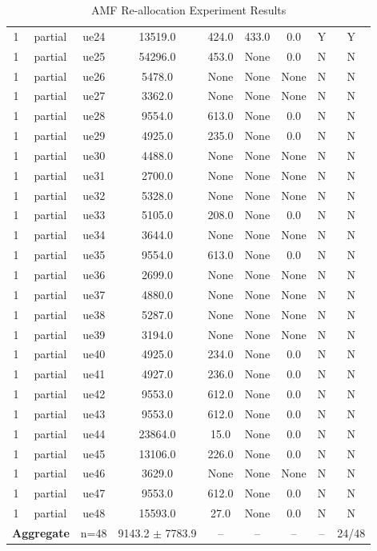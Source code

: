 \begin{table}[ht]
\begin{tabular}{|c|c|c|c|c|c|c|c|c|}
1 & partial & ue24 & 13519.0 & 424.0 & 433.0 & 0.0 & Y & Y \\
1 & partial & ue25 & 54296.0 & 453.0 & None & 0.0 & N & N \\
1 & partial & ue26 & 5478.0 & None & None & None & N & N \\
1 & partial & ue27 & 3362.0 & None & None & None & N & N \\
1 & partial & ue28 & 9554.0 & 613.0 & None & 0.0 & N & N \\
1 & partial & ue29 & 4925.0 & 235.0 & None & 0.0 & N & N \\
1 & partial & ue30 & 4488.0 & None & None & None & N & N \\
1 & partial & ue31 & 2700.0 & None & None & None & N & N \\
1 & partial & ue32 & 5328.0 & None & None & None & N & N \\
1 & partial & ue33 & 5105.0 & 208.0 & None & 0.0 & N & N \\
1 & partial & ue34 & 3644.0 & None & None & None & N & N \\
1 & partial & ue35 & 9554.0 & 613.0 & None & 0.0 & N & N \\
1 & partial & ue36 & 2699.0 & None & None & None & N & N \\
1 & partial & ue37 & 4880.0 & None & None & None & N & N \\
1 & partial & ue38 & 5287.0 & None & None & None & N & N \\
1 & partial & ue39 & 3194.0 & None & None & None & N & N \\
1 & partial & ue40 & 4925.0 & 234.0 & None & 0.0 & N & N \\
1 & partial & ue41 & 4927.0 & 236.0 & None & 0.0 & N & N \\
1 & partial & ue42 & 9553.0 & 612.0 & None & 0.0 & N & N \\
1 & partial & ue43 & 9553.0 & 612.0 & None & 0.0 & N & N \\
1 & partial & ue44 & 23864.0 & 15.0 & None & 0.0 & N & N \\
1 & partial & ue45 & 13106.0 & 226.0 & None & 0.0 & N & N \\
1 & partial & ue46 & 3629.0 & None & None & None & N & N \\
1 & partial & ue47 & 9553.0 & 612.0 & None & 0.0 & N & N \\
1 & partial & ue48 & 15593.0 & 27.0 & None & 0.0 & N & N \\
\multicolumn{2}{|c|}{\textbf{Aggregate}} & n=48 & 9143.2 $\pm$ 7783.9 & -- & -- & -- & -- & 24/48 \\
\hline
\end{tabular}
\caption{AMF Re-allocation Experiment Results}
\label{tab:amf_realloc}
\end{table}
